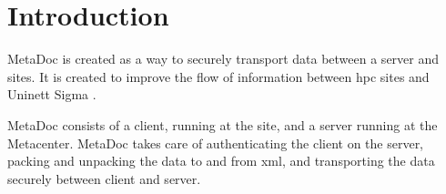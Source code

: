 \newpage
\section{Introduction}
MetaDoc is created as a way to securely transport data between a server and 
sites. It is created to improve the flow of information between \gls{hpc} sites
and Uninett Sigma \cite{improvingflow}.

MetaDoc consists of a client, running at the site, and a server running at the
Metacenter. MetaDoc takes care of authenticating the client on the server,
packing and unpacking the data to and from \gls{xml}, and transporting the data
securely between client and server. 
